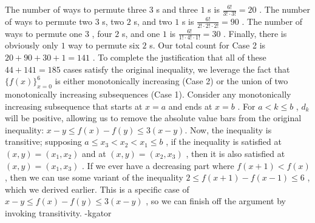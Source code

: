 \documentclass[12pt]{article}
\begin{document}
The number of ways to permute three $3$ s and three $1$ s is $\frac{6!}{3! \cdot 3!} = 20$ .
The number of ways to permute two $3$ s, two $2$ s, and two $1$ s is $\frac{6!}{2! \cdot 2! \cdot 2!} = 90$ .
The number of ways to permute one $3$ , four $2$ s, and one $1$ is $\frac{6!}{1! \cdot 4! \cdot 1!} = 30$ .
Finally, there is obviously only $1$ way to permute six $2$ s. Our total count for Case 2 is $20 + 90 + 30 + 1 = 141$ . To complete the justification that all of these $44 + 141 = \boxed{185}$ cases satisfy the original inequality, we leverage the fact that $\{f(x)\}_{x=0}^{6}$ is either monotonically increasing (Case 2) or the union of two monotonically increasing subsequences (Case 1). Consider any monotonically increasing subsequence that starts at $x = a$ and ends at $x = b$ . For $a < k \leq b$ , $d_k$ will be positive, allowing us to remove the absolute value bars from the original inequality: $x - y \leq f(x) - f(y) \leq 3(x - y).$ Now, the inequality is transitive; supposing $a \leq x_3 < x_2 < x_1 \leq b$ , if the inequality is satisfied at $(x, y) = \left(x_1, x_2\right)$ and at $(x, y) = \left(x_2, x_3\right)$ , then it is also satisfied at $(x, y) = \left(x_1, x_3\right)$ . If we ever have a decreasing part where $f(x + 1) < f(x)$ , then we can use some variant of the inequality $2 \leq f(x + 1) - f(x - 1) \leq 6$ , which we derived earlier. This is a specific case of $x - y \leq f(x) - f(y) \leq 3(x - y)$ , so we can finish off the argument by invoking transitivity. -kgator
\end{document}
